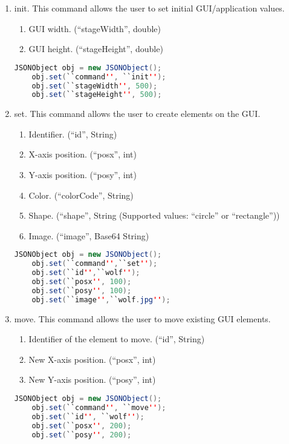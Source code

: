 \documentclass[11pt,a4paper]{article}
\begin{document}
\begin{enumerate}
	\item init. This command allows the user to set initial GUI/application values.
		\begin{enumerate}
			\item GUI width. (``stageWidth'', double)
			\item GUI height. (``stageHeight'', double)
		\end{enumerate}
	\begin{lstlisting}[language=java]
	JSONObject obj = new JSONObject();
	obj.set(``command'', ``init'');
	obj.set(``stageWidth'', 500);
	obj.set(``stageHeight'', 500);
	\end{lstlisting}
	\item set. This command allows the user to create elements on the GUI.
		\begin{enumerate}
			\item Identifier. (``id'', String)
			\item X-axis position. (``posx'', int)
			\item Y-axis position. (``posy'', int)
			\item Color. (``colorCode'', String)
			\item Shape. (``shape'', String (Supported values: ``circle'' or ``rectangle''))
			\item Image. (``image'', Base64 String)
		\end{enumerate}
	\begin{lstlisting}[language=java]
	JSONObject obj = new JSONObject();
	obj.set(``command'',``set'');
	obj.set(``id'',``wolf'');
	obj.set(``posx'', 100);
	obj.set(``posy'', 100);
	obj.set(``image'',``wolf.jpg'');
	\end{lstlisting}
	\item move. This command allows the user to move existing GUI elements.
		\begin{enumerate}
			\item Identifier of the element to move. (``id'', String)
			\item New X-axis position. (``posx'', int)
			\item New Y-axis position. (``posy'', int)
		\end{enumerate}
	\begin{lstlisting}[language=java]
	JSONObject obj = new JSONObject();
	obj.set(``command'', ``move'');
	obj.set(``id'', ``wolf'');
	obj.set(``posx'', 200);
	obj.set(``posy'', 200);
	\end{lstlisting}

\end{enumerate}
\end{document}
